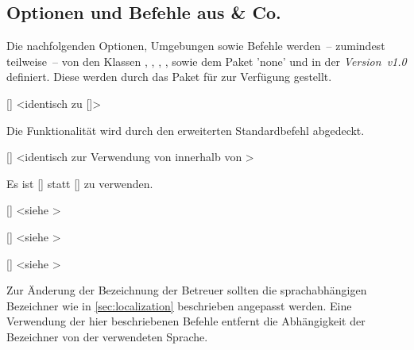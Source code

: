 \begin{DeclareEntity}{}
\subsection{Optionen und Befehle aus  \& Co.}

Die nachfolgenden Optionen, Umgebungen sowie Befehle werden~-- zumindest 
teilweise~-- von den Klassen , , 
, ,  sowie dem Paket 
'none' und \TUDScript in der \emph{Version~v1.0} definiert. 
Diese werden durch das Paket  für \vTUDScript{\TUDScript} 
zur Verfügung gestellt.

\begin{Declaration}
  {[]}
  <identisch zu []>
\printdeclarationlist

Die Funktionalität wird durch den erweiterten Standardbefehl  
abgedeckt.
\end{Declaration}

\begin{Declaration}
  {[]}
  <identisch zur Verwendung von  innerhalb von >
\printdeclarationlist

Es ist []
statt [] zu verwenden.
\end{Declaration}

\begin{Declaration}
  {[]}
  <siehe >
\begin{Declaration}
  {[]}
  <siehe >
\begin{Declaration}
  {[]}
  <siehe >
\printdeclarationlist

Zur Änderung der Bezeichnung der Betreuer sollten die sprachabhängigen 
Bezeichner wie in \autoref{sec:localization} beschrieben angepasst werden. Eine 
Verwendung der hier beschriebenen Befehle entfernt die Abhängigkeit der 
Bezeichner von der verwendeten Sprache.
\end{Declaration}
\end{Declaration}
\end{Declaration}

\begin{Declaration}
  {}
\printdeclarationlist


\end{Declaration}
\end{DeclareEntity}
